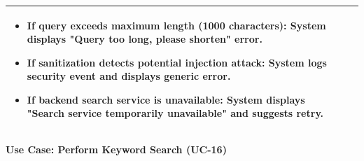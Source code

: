 \begin{minipage}{\textwidth}
\begin{tabularx}{\textwidth}{|p{}|X|}
{\begin{itemize}
            \item If query exceeds maximum length (1000 characters): System displays "Query too long, please shorten" error.
            \item If sanitization detects potential injection attack: System logs security event and displays generic error.
            \item If backend search service is unavailable: System displays "Search service temporarily unavailable" and suggests retry.
        \end{itemize}%
        } \\
    \hline
\end{tabularx}
\end{minipage}
\bigskip


\begin{minipage}{\textwidth}
\begin{center}
    \textbf{Use Case: Perform Keyword Search (UC-16)}
\end{center}
\vspace{0.5ex}
\small


\end{minipage}

